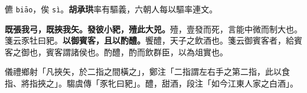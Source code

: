 \begin{quoting}儦 \texttt{biāo}，俟 \texttt{sì}。\textbf{胡承珙}率有驅義，六朝人每以驅率連文。\end{quoting}

\textbf{既張我弓，既挾我矢。發彼小豝，殪此大兕。}{\footnotesize 殪，壹發而死，言能中微而制大也。箋云豕牡曰豝。}\textbf{以御賓客，且以酌醴。}{\footnotesize 饗醴，天子之飲酒也。箋云御賓客者，給賓客之御也，賓客謂諸侯也。酌醴，酌而飲群臣，以為俎實也。}

\begin{quoting}儀禮鄉射「凡挾矢，於二指之間橫之」，鄭注「二指謂左右手之第二指，此以食指、將指挾之」。騶虞傳「豕牝曰豝」。醴，甜酒，段注「如今江東人家之白酒」。\end{quoting}

